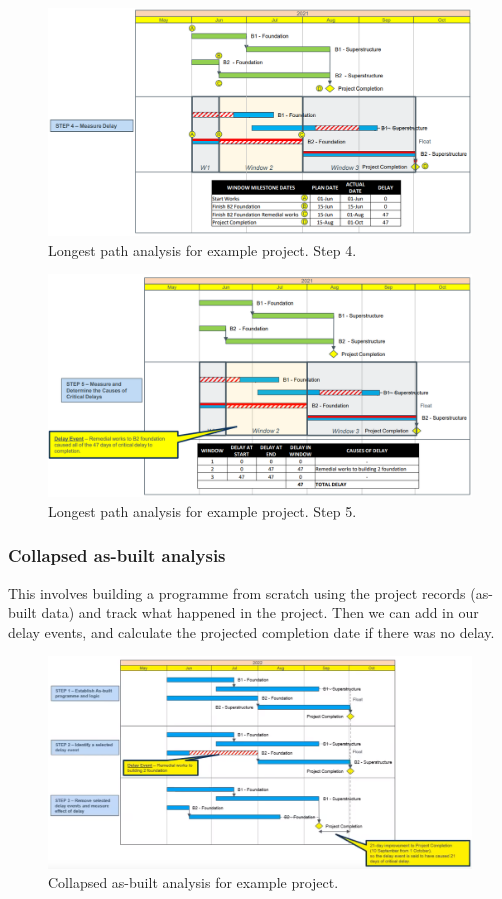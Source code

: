\begin{figure}[H]
    \centering
    \includegraphics[width = \textwidth]{img/figure43.png}
    \caption{Longest path analysis for example project. Step 4.}
\end{figure}
\begin{figure}[H]
    \centering
    \includegraphics[width = \textwidth]{img/figure44.png}
    \caption{Longest path analysis for example project. Step 5.}
\end{figure}
\subsubsection{Collapsed as-built analysis}
This involves building a programme from scratch using the project records (as-built data) and track what happened in the project. Then we can add in our delay events, and calculate the projected completion date if there was no delay.
\begin{figure}[H]
    \centering
    \includegraphics[width = \textwidth]{img/figure45.png}
    \caption{Collapsed as-built analysis for example project.}
\end{figure}
